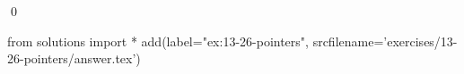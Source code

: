 
\begin{ex}
  \label{ex:13-26-pointers}
  
  \qed
\end{ex}
\begin{python0}
from solutions import *
add(label="ex:13-26-pointers",
    srcfilename='exercises/13-26-pointers/answer.tex')
\end{python0}
